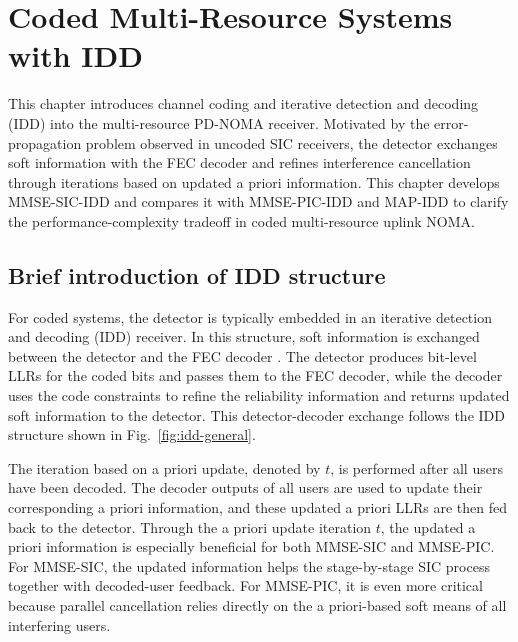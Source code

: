 \chapter{Coded Multi-Resource Systems with IDD}\label{ch:coded}

This chapter introduces channel coding and iterative detection and decoding (IDD) into the multi-resource PD-NOMA receiver. Motivated by the error-propagation problem observed in uncoded SIC receivers, the detector exchanges soft information with the FEC decoder and refines interference cancellation through iterations based on updated a priori information. This chapter develops MMSE-SIC-IDD and compares it with MMSE-PIC-IDD and MAP-IDD to clarify the performance-complexity tradeoff in coded multi-resource uplink NOMA.

\section{Brief introduction of IDD structure}

For coded systems, the detector is typically embedded in an iterative detection and decoding (IDD) receiver. In this structure, soft information is exchanged between the detector and the FEC decoder \cite{li2024turbo,sahin2024rsma,lin2024slotted}. The detector produces bit-level LLRs for the coded bits and passes them to the FEC decoder, while the decoder uses the code constraints to refine the reliability information and returns updated soft information to the detector. This detector-decoder exchange follows the IDD structure shown in Fig.~\ref{fig:idd-general}.


The iteration based on a priori update, denoted by $t$, is performed after all users have been decoded. The decoder outputs of all users are used to update their corresponding a priori information, and these updated a priori LLRs are then fed back to the detector. Through the a priori update iteration $t$, the updated a priori information is especially beneficial for both MMSE-SIC and MMSE-PIC. For MMSE-SIC, the updated information helps the stage-by-stage SIC process together with decoded-user feedback. For MMSE-PIC, it is even more critical because parallel cancellation relies directly on the a priori-based soft means of all interfering users.

